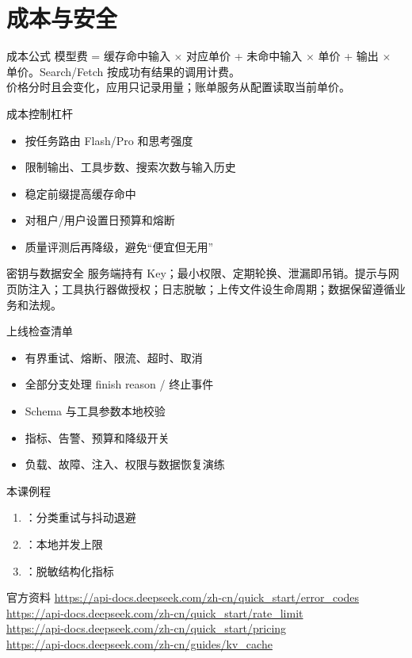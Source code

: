 \documentclass[aspectratio=169,UTF8]{ctexbeamer}
\begin{document}
\section{成本与安全}
\begin{frame}{成本公式}
模型费 = 缓存命中输入 $\times$ 对应单价 + 未命中输入 $\times$ 单价 + 输出 $\times$ 单价。Search/Fetch 按成功有结果的调用计费。\\[8pt]
价格分时且会变化，应用只记录用量；账单服务从配置读取当前单价。
\end{frame}
\begin{frame}{成本控制杠杆}
\begin{itemize}
  \item 按任务路由 Flash/Pro 和思考强度
  \item 限制输出、工具步数、搜索次数与输入历史
  \item 稳定前缀提高缓存命中
  \item 对租户/用户设置日预算和熔断
  \item 质量评测后再降级，避免“便宜但无用”
\end{itemize}
\end{frame}
\begin{frame}{密钥与数据安全}
服务端持有 Key；最小权限、定期轮换、泄漏即吊销。提示与网页防注入；工具执行器做授权；日志脱敏；上传文件设生命周期；数据保留遵循业务和法规。
\end{frame}
\begin{frame}{上线检查清单}
\begin{itemize}
  \item 有界重试、熔断、限流、超时、取消
  \item 全部分支处理 finish reason / 终止事件
  \item Schema 与工具参数本地校验
  \item 指标、告警、预算和降级开关
  \item 负载、故障、注入、权限与数据恢复演练
\end{itemize}
\end{frame}
\begin{frame}{本课例程}
\begin{enumerate}
  \item {}：分类重试与抖动退避
  \item {}：本地并发上限
  \item {}：脱敏结构化指标
\end{enumerate}
\end{frame}
\begin{frame}{官方资料}
\small
\url{https://api-docs.deepseek.com/zh-cn/quick_start/error_codes}\\
\url{https://api-docs.deepseek.com/zh-cn/quick_start/rate_limit}\\
\url{https://api-docs.deepseek.com/zh-cn/quick_start/pricing}\\
\url{https://api-docs.deepseek.com/zh-cn/guides/kv_cache}
\end{frame}
\end{document}
